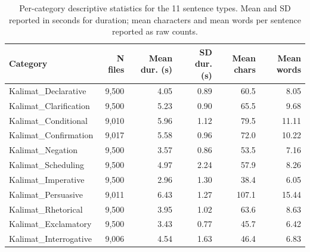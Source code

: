 \begin{table}[!t]
  \centering
  \caption{Per-category descriptive statistics for the 11 sentence
           types. Mean and SD reported in seconds for duration; mean
           characters and mean words per sentence reported as raw
           counts.}
  \label{tab:per_category}
  \small
  \begin{tabular}{lrrrrr}
  \toprule
  Category & N files & Mean dur. (s) & SD dur. (s) & Mean chars & Mean words \\
  \midrule
  Kalimat\_Declarative    & 9{,}500 & 4.05 & 0.89 & 60.5  & 8.05 \\
  Kalimat\_Clarification   & 9{,}500 & 5.23 & 0.90 & 65.5  & 9.68 \\
  Kalimat\_Conditional   & 9{,}010 & 5.96 & 1.12 & 79.5  & 11.11 \\
  Kalimat\_Confirmation    & 9{,}017 & 5.58 & 0.96 & 72.0  & 10.22 \\
  Kalimat\_Negation        & 9{,}500 & 3.57 & 0.86 & 53.5  & 7.16 \\
  Kalimat\_Scheduling   & 9{,}500 & 4.97 & 2.24 & 57.9  & 8.26 \\
  Kalimat\_Imperative      & 9{,}500 & 2.96 & 1.30 & 38.4  & 6.05 \\
  Kalimat\_Persuasive     & 9{,}011 & 6.43 & 1.27 & 107.1 & 15.44 \\
  Kalimat\_Rhetorical       & 9{,}500 & 3.95 & 1.02 & 63.6  & 8.63 \\
  Kalimat\_Exclamatory        & 9{,}500 & 3.43 & 0.77 & 45.7  & 6.42 \\
  Kalimat\_Interrogative         & 9{,}006 & 4.54 & 1.63 & 46.4  & 6.83 \\
  \bottomrule
  \end{tabular}
\end{table}
